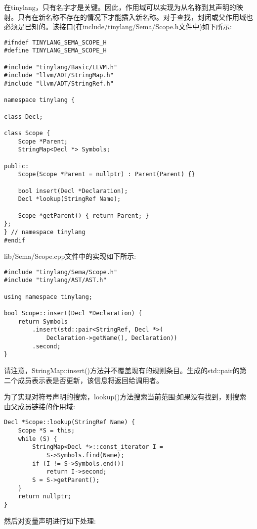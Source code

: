 在tinylang，只有名字才是关键。因此，作用域可以实现为从名称到其声明的映射。只有在新名称不存在的情况下才能插入新名称。对于查找，封闭或父作用域也必须是已知的。该接口(在include/tinylang/Sema/Scope.h文件中)如下所示:\par

\begin{lstlisting}[caption={}]
#ifndef TINYLANG_SEMA_SCOPE_H
#define TINYLANG_SEMA_SCOPE_H

#include "tinylang/Basic/LLVM.h"
#include "llvm/ADT/StringMap.h"
#include "llvm/ADT/StringRef.h"

namespace tinylang {
	
class Decl;

class Scope {
	Scope *Parent;
	StringMap<Decl *> Symbols;
	
public:
	Scope(Scope *Parent = nullptr) : Parent(Parent) {}
	
	bool insert(Decl *Declaration);
	Decl *lookup(StringRef Name);
	
	Scope *getParent() { return Parent; }
};
} // namespace tinylang
#endif
\end{lstlisting}

lib/Sema/Scope.cpp文件中的实现如下所示:\par

\begin{lstlisting}[caption={}]
#include "tinylang/Sema/Scope.h"
#include "tinylang/AST/AST.h"

using namespace tinylang;

bool Scope::insert(Decl *Declaration) {
	return Symbols
		.insert(std::pair<StringRef, Decl *>(
			Declaration->getName(), Declaration))
		.second;
}
\end{lstlisting}

请注意，StringMap::insert()方法并不覆盖现有的规则条目。生成的std::pair的第二个成员表示表是否更新，该信息将返回给调用者。\par

为了实现对符号声明的搜索，lookup()方法搜索当前范围;如果没有找到，则搜索由父成员链接的作用域:\par

\begin{lstlisting}[caption={}]
Decl *Scope::lookup(StringRef Name) {
	Scope *S = this;
	while (S) {
		StringMap<Decl *>::const_iterator I =
			S->Symbols.find(Name);
		if (I != S->Symbols.end())
			return I->second;
		S = S->getParent();
	}
	return nullptr;
}
\end{lstlisting}

然后对变量声明进行如下处理:\par

